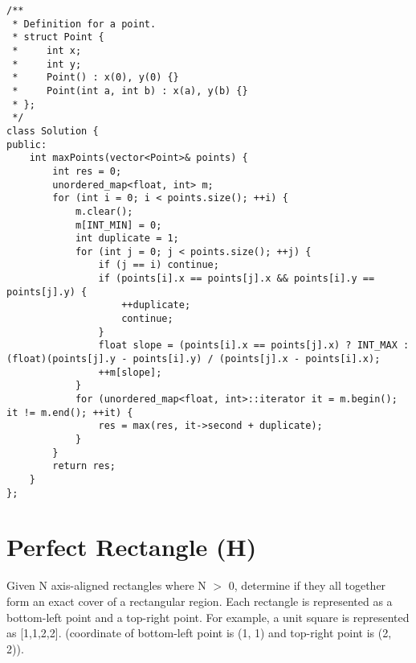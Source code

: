 \begin{lstlisting}
/**
 * Definition for a point.
 * struct Point {
 *     int x;
 *     int y;
 *     Point() : x(0), y(0) {}
 *     Point(int a, int b) : x(a), y(b) {}
 * };
 */
class Solution {
public:
    int maxPoints(vector<Point>& points) {
        int res = 0;
        unordered_map<float, int> m;
        for (int i = 0; i < points.size(); ++i) {
            m.clear();
            m[INT_MIN] = 0;
            int duplicate = 1;
            for (int j = 0; j < points.size(); ++j) {
                if (j == i) continue;
                if (points[i].x == points[j].x && points[i].y == points[j].y) {
                    ++duplicate;
                    continue;
                }
                float slope = (points[i].x == points[j].x) ? INT_MAX : (float)(points[j].y - points[i].y) / (points[j].x - points[i].x);
                ++m[slope];
            }
            for (unordered_map<float, int>::iterator it = m.begin(); it != m.end(); ++it) {
                res = max(res, it->second + duplicate);
            }
        }
        return res;
    }
};
\end{lstlisting}


\section{Perfect Rectangle (H)}
Given N axis-aligned rectangles where N $>$ 0, determine if they all together form an exact cover of a rectangular region. Each rectangle is represented as a bottom-left point and a top-right point. For example, a unit square is represented as [1,1,2,2]. (coordinate of bottom-left point is (1, 1) and top-right point is (2, 2)). \\

